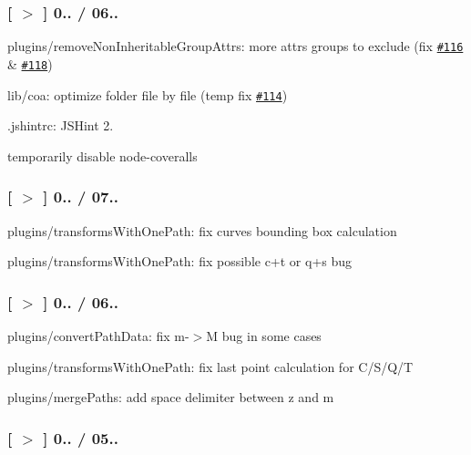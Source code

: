 \subsubsection*{\mbox{[} \href{https://github.com/svg/svgo/tree/v0.3.6}{\tt $>$} \mbox{]} 0.. / 06..}


\begin{DoxyItemize}
\item plugins/remove\+Non\+Inheritable\+Group\+Attrs\+: more attrs groups to exclude (fix \href{https://github.com/svg/svgo/issues/116}{\tt \#116} \& \href{https://github.com/svg/svgo/issues/118}{\tt \#118})
\item lib/coa\+: optimize folder file by file (temp fix \href{https://github.com/svg/svgo/issues/114}{\tt \#114})
\item {\ttfamily .jshintrc}\+: J\+S\+Hint 2.
\item temporarily disable node-\/coveralls
\end{DoxyItemize}

\subsubsection*{\mbox{[} \href{https://github.com/svg/svgo/tree/v0.3.5}{\tt $>$} \mbox{]} 0.. / 07..}


\begin{DoxyItemize}
\item plugins/transforms\+With\+One\+Path\+: fix curves bounding box calculation
\item plugins/transforms\+With\+One\+Path\+: fix possible c+t or q+s bug
\end{DoxyItemize}

\subsubsection*{\mbox{[} \href{https://github.com/svg/svgo/tree/v0.3.4}{\tt $>$} \mbox{]} 0.. / 06..}


\begin{DoxyItemize}
\item plugins/convert\+Path\+Data\+: fix m-\/$>$M bug in some cases
\item plugins/transforms\+With\+One\+Path\+: fix last point calculation for C/\+S/\+Q/T
\item plugins/merge\+Paths\+: add space delimiter between z and m
\end{DoxyItemize}

\subsubsection*{\mbox{[} \href{https://github.com/svg/svgo/tree/v0.3.3}{\tt $>$} \mbox{]} 0.. / 05..}


